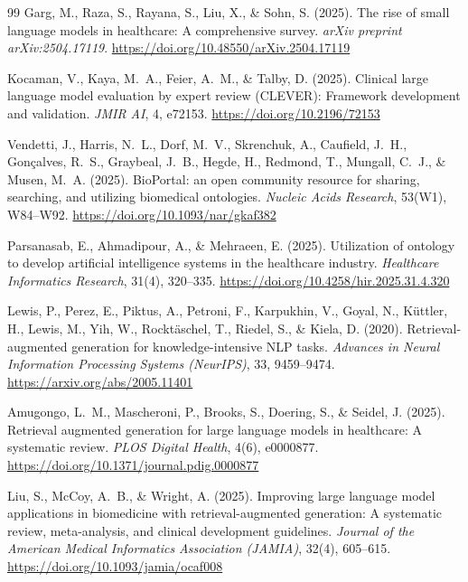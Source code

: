 \documentclass[CAT]{TFUOC}%
\begin{document}
\begin{thebibliography}{99}
Garg, M., Raza, S., Rayana, S., Liu, X., \& Sohn, S. (2025).
\newblock The rise of small language models in healthcare:
A comprehensive survey.
\newblock \textit{arXiv preprint arXiv:2504.17119}.
\newblock \url{https://doi.org/10.48550/arXiv.2504.17119}

Kocaman, V., Kaya, M.~A., Feier, A.~M., \& Talby, D. (2025).
\newblock Clinical large language model evaluation by expert
review (CLEVER): Framework development and validation.
\newblock \textit{JMIR AI}, 4, e72153.
\newblock \url{https://doi.org/10.2196/72153}


Vendetti, J., Harris, N.~L., Dorf, M.~V., Skrenchuk, A., Caufield, J.~H., Gon\c{c}alves, R.~S., Graybeal, J.~B., Hegde, H., Redmond, T., Mungall, C.~J., \& Musen, M.~A. (2025).
\newblock BioPortal: an open community resource for sharing, searching, and utilizing biomedical ontologies.
\newblock \textit{Nucleic Acids Research}, 53(W1), W84--W92.
\newblock \url{https://doi.org/10.1093/nar/gkaf382}

Parsanasab, E., Ahmadipour, A., \& Mehraeen, E. (2025).
\newblock Utilization of ontology to develop artificial intelligence systems in the healthcare industry.
\newblock \textit{Healthcare Informatics Research}, 31(4), 320--335.
\newblock \url{https://doi.org/10.4258/hir.2025.31.4.320}


Lewis, P., Perez, E., Piktus, A., Petroni, F., Karpukhin, V., Goyal, N., K\"uttler, H., Lewis, M., Yih, W., Rockt\"aschel, T., Riedel, S., \& Kiela, D. (2020).
\newblock Retrieval-augmented generation for knowledge-intensive NLP tasks.
\newblock \textit{Advances in Neural Information Processing Systems
(NeurIPS)}, 33, 9459--9474.
\newblock \url{https://arxiv.org/abs/2005.11401}

Amugongo, L.~M., Mascheroni, P., Brooks, S., Doering, S., \& Seidel, J. (2025).
\newblock Retrieval augmented generation for large language models in healthcare: A systematic review.
\newblock \textit{PLOS Digital Health}, 4(6), e0000877.
\newblock \url{https://doi.org/10.1371/journal.pdig.0000877}

Liu, S., McCoy, A.~B., \& Wright, A. (2025).
\newblock Improving large language model applications in
biomedicine with retrieval-augmented generation: A systematic
review, meta-analysis, and clinical development guidelines.
\newblock \textit{Journal of the American Medical Informatics
Association (JAMIA)}, 32(4), 605--615.
\newblock \url{https://doi.org/10.1093/jamia/ocaf008}


\end{thebibliography}
\end{document}
